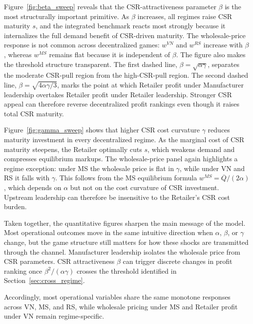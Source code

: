 Figure~\ref{fig:beta_sweep} reveals that the CSR-attractiveness parameter $\beta$
is the most structurally important primitive. As $\beta$ increases, all regimes raise
CSR maturity $s$, and the integrated benchmark reacts most strongly because it
internalizes the full demand benefit of CSR-driven maturity. The wholesale-price response
is not common across decentralized games: $w^{VN}$ and $w^{RS}$ increase with $\beta$,
whereas $w^{MS}$ remains flat because it is independent of $\beta$. The figure also makes
the threshold structure transparent. The first dashed line,
$\beta=\sqrt{\alpha\gamma}$, separates the moderate CSR-pull region from the high-CSR-pull
region. The second dashed line, $\beta=\sqrt{4\alpha\gamma/3}$, marks the point at which
Retailer profit under Manufacturer leadership overtakes Retailer profit under Retailer
leadership. Stronger CSR appeal can therefore reverse decentralized profit rankings even though it raises total CSR maturity.

Figure~\ref{fig:gamma_sweep} shows that higher CSR cost curvature $\gamma$
reduces maturity investment in every decentralized regime. As the marginal cost of
CSR maturity steepens, the Retailer optimally cuts $s$, which weakens demand and
compresses equilibrium markups. The wholesale-price panel again highlights a regime
exception: under MS the wholesale price is flat in $\gamma$, while under VN and RS it
falls with $\gamma$. This follows from the MS equilibrium formula
$w^{MS}=\overline Q/(2\alpha)$, which depends on $\alpha$ but not on the cost curvature of
CSR investment. Upstream leadership can therefore be insensitive to the Retailer's CSR cost burden.

Taken together, the quantitative figures sharpen the main message of the model. Most
operational outcomes move in the same intuitive direction when $\alpha$, $\beta$, or
$\gamma$ change, but the game structure still matters for how these shocks are transmitted
through the channel. Manufacturer leadership isolates the wholesale price
from CSR parameters. CSR attractiveness $\beta$ can trigger
discrete changes in profit ranking once $\beta^2/(\alpha\gamma)$ crosses the threshold
identified in Section~\ref{sec:cross_regime}.

Accordingly, most operational variables share the same monotone responses across VN, MS, and RS, while wholesale pricing under MS and Retailer profit under VN remain regime-specific.



